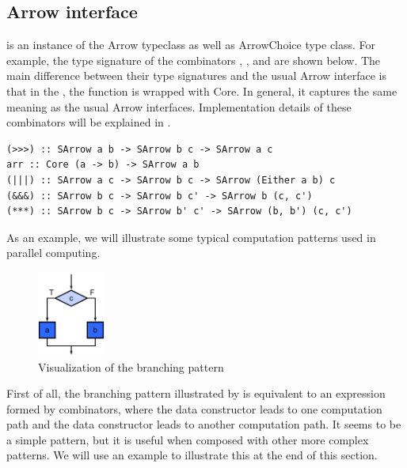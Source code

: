 \subsection{Arrow interface}
 is an instance of the Arrow typeclass as well as ArrowChoice type class. For example, the type signature of the combinators \hask{>>>}, \hask{|||}, \hask{&&&} and  are shown below. The main difference between their type signatures and the usual Arrow interface is that in the , the function is wrapped with Core. In general, it captures the same meaning as the usual Arrow interfaces. Implementation details of these combinators will be explained in .
\begin{code}
\begin{verbatim}
(>>>) :: SArrow a b -> SArrow b c -> SArrow a c
arr :: Core (a -> b) -> SArrow a b
(|||) :: SArrow a c -> SArrow b c -> SArrow (Either a b) c
(&&&) :: SArrow b c -> SArrow b c' -> SArrow b (c, c')
(***) :: SArrow b c -> SArrow b' c' -> SArrow (b, b') (c, c')
\end{verbatim}
\end{code}

As an example, we will illustrate some typical computation patterns used in parallel computing.
\begin{figure}[ht]
    \centering
    \includegraphics[width=0.2\textwidth]{arrow/select.png}
    \caption{Visualization of the branching pattern \cite{mccoolStructuredParallelPrograming2012}}
    \label{SArrow:fig:select}
\end{figure}

First of all, the branching pattern illustrated by  is equivalent to an expression formed by \hask{|||} combinators, where the data constructor  leads to one computation path and the data constructor  leads to another computation path. It seems to be a simple pattern, but it is useful when composed with other more complex patterns. We will use an example to illustrate this at the end of this section.

